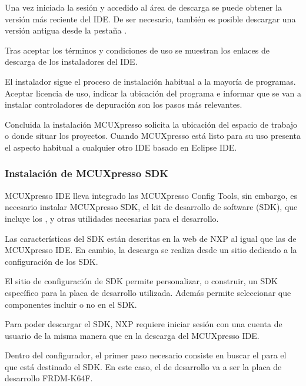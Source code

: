 Una vez iniciada la sesión y accedido al área de descarga se puede obtener
la versión más reciente del IDE. De ser necesario, también es posible descargar
una versión antigua desde la pestaña .

Tras aceptar los términos y condiciones de uso se muestran los enlaces de
descarga de los instaladores del IDE. 


El instalador sigue el proceso de instalación habitual a la mayoría de programas.
Aceptar licencia de uso, indicar la ubicación del programa e informar
que se van a instalar controladores de depuración son los pasos más relevantes.

Concluida la instalación MCUXpresso solicita la ubicación del espacio de trabajo
o  donde situar los proyectos. Cuando MCUXpresso
está listo para su uso presenta el aspecto habitual a cualquier otro IDE basado
en Eclipse IDE.


\subsubsection{Instalación de MCUXpresso SDK} \label{sec:instalacion-mcu}
MCUXpresso IDE lleva integrado las MCUXpresso Config Tools, sin embargo, es
necesario instalar MCUXpresso SDK, el kit de desarrollo de software (SDK),
que incluye los ,  y otras
utilidades necesarias para el desarrollo.

Las características del SDK están descritas en la web de NXP
\cite{webpage:mcuxpresso-sdk} al igual que las de MCUXpresso IDE. En cambio,
la descarga se realiza desde un sitio dedicado a la configuración de los SDK.


El sitio de configuración de SDK permite personalizar, o construir, un SDK
específico para la placa de desarrollo utilizada. Además permite seleccionar
que componentes incluir o no en el SDK.

Para poder descargar el SDK, NXP requiere iniciar sesión con una cuenta de
usuario de la misma manera que en la descarga del MCUXpresso IDE.

Dentro del configurador, el primer paso necesario consiste en buscar el
\hw{} para el que está destinado el SDK. En este caso, el \hw{} de desarrollo
va a ser la placa de desarrollo FRDM-K64F.

